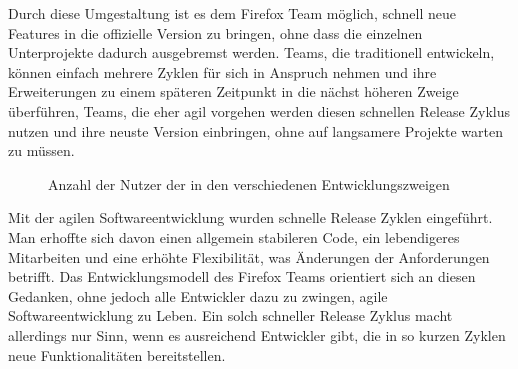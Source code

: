 Durch diese Umgestaltung ist es dem Firefox Team möglich, schnell neue Features in die offizielle Version zu bringen, ohne dass die einzelnen Unterprojekte dadurch ausgebremst werden. Teams, die traditionell entwickeln, können einfach mehrere Zyklen für sich in Anspruch nehmen und ihre Erweiterungen zu einem späteren Zeitpunkt in die nächst höheren Zweige überführen, Teams, die eher agil vorgehen werden diesen schnellen Release Zyklus nutzen und ihre neuste Version einbringen, ohne auf langsamere Projekte warten zu müssen.

\begin{figure}[h]
	\centering
	\caption{Anzahl der Nutzer der in den verschiedenen Entwicklungszweigen}
	\label{fireusers}
\end{figure}

Mit der agilen Softwareentwicklung wurden schnelle Release Zyklen eingeführt. Man erhoffte sich davon einen allgemein stabileren Code, ein lebendigeres Mitarbeiten und eine erhöhte Flexibilität, was Änderungen der Anforderungen betrifft. Das Entwicklungsmodell des Firefox Teams orientiert sich an diesen Gedanken, ohne jedoch alle Entwickler dazu zu zwingen, agile Softwareentwicklung zu Leben. Ein solch schneller Release Zyklus macht allerdings nur Sinn, wenn es ausreichend Entwickler gibt, die in so kurzen Zyklen neue Funktionalitäten bereitstellen.

